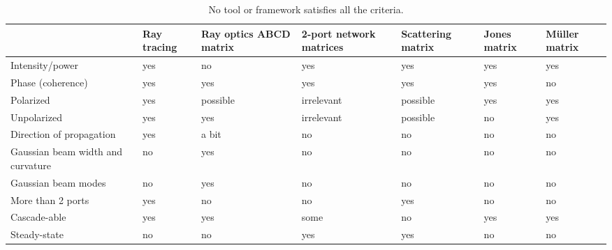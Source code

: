 \begin{table}
    \centering
    {\footnotesize
    \begin{tabularx}{\textwidth}{X|X X X X X X}
        \toprule
                                          & Ray tracing & Ray optics ABCD matrix & 2-port network matrices & Scattering matrix & Jones matrix & Müller matrix  \\
        \midrule
        Intensity/power                   & yes         & no                     & yes                     & yes               & yes          & yes            \\
        Phase (coherence)                 & yes         & yes                    & yes                     & yes               & yes          & no             \\
        Polarized                         & yes         & possible               & irrelevant              & possible          & yes          & yes            \\
        Unpolarized                       & yes         & yes                    & irrelevant              & possible          & no           & yes            \\
        Direction of propagation          & yes         & a bit                  & no                      & no                & no           & no             \\
        Gaussian beam width and curvature & no          & yes                    & no                      & no                & no           & no             \\
        Gaussian beam modes               & no          & yes                    & no                      & no                & no           & no             \\
        More than 2 ports                 & yes         & no                     & no                      & yes               & no           & no             \\
        Cascade-able                      & yes         & yes                    & some                    & no                & yes          & yes            \\
        Steady-state                      & no          & no                     & yes                     & yes               & no           & no             \\
        \bottomrule
        \end{tabularx}
    }
    \caption{\label{tab:tools}No tool or framework satisfies all the criteria.}
\end{table}
    
